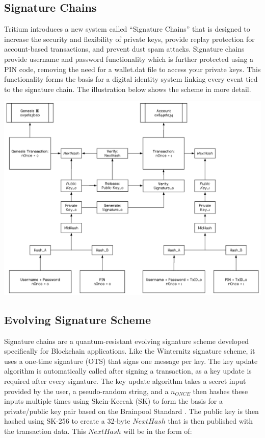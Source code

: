 \documentclass[11pt]{article}
\begin{document}
\subsection{Signature Chains}

\noindent Tritium introduces a new system called ``Signature Chains'' that is designed to increase the security and flexibility of private keys, provide replay protection for account-based transactions, and prevent dust spam attacks.
Signature chains provide username and password functionality which is further protected using a PIN code, removing the need for a wallet.dat file to access your private keys.
This functionality forms the basis for a digital identity system linking every event tied to the signature chain.
The illustration below shows the scheme in more detail.

\medskip
\hspace{-22pt}
\includegraphics[width=1.00\textwidth]{./images/rsz_sigchains.png}

\subsection{Evolving Signature Scheme}

Signature chains are a quantum-resistant evolving signature scheme developed specifically for Blockchain applications. 
Like the Winternitz signature scheme, it uses a one-time signature (OTS) that signs one message per key. 
The key update algorithm is automatically called after signing a transaction, as a key update is required after every signature.
The key update algorithm takes a secret input provided by the user, a pseudo-random string, and a $n_{ONCE}$ then hashes these inputs multiple times using Skein-Keccak (SK) to form the basis for a private/public key pair based on the Brainpool Standard \cite{Brainpool_Standard}. 
The public key is then hashed using SK-256 to create a 32-byte $NextHash$ that is then published with the transaction data.
This $NextHash$ will be in the form of:
\end{document}
